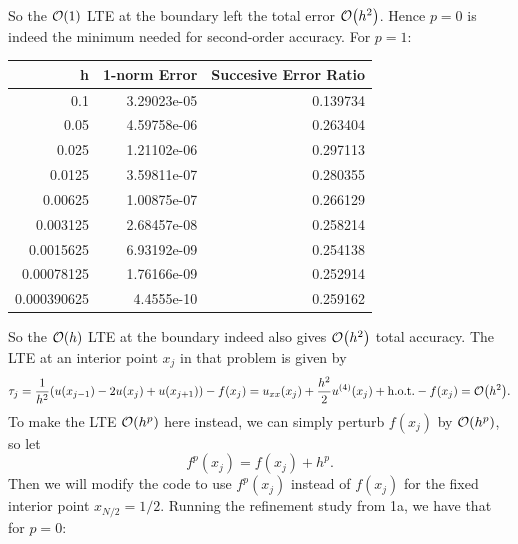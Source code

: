 \documentclass[12pt]{article}
\begin{document}
So the $\order{1}$ LTE at the boundary left the total error $\order{h^2}$.  Hence $p=0$ is indeed the minimum needed for second-order accuracy.  For $p=1$: \\
\begin{center}
\begin{tabular}{rrr}
\hline
    h &   1-norm Error &   Succesive Error Ratio \\
\hline
 0.1         &                   3.29023e-05 &                0.139734 \\
 0.05        &                   4.59758e-06 &                0.263404 \\
 0.025       &                   1.21102e-06 &                0.297113 \\
 0.0125      &                   3.59811e-07 &                0.280355 \\
 0.00625     &                   1.00875e-07 &                0.266129 \\
 0.003125    &                   2.68457e-08 &                0.258214 \\
 0.0015625   &                   6.93192e-09 &                0.254138 \\
 0.00078125  &                   1.76166e-09 &                0.252914 \\
 0.000390625 &                   4.4555e-10  &                0.259162 \\
\hline
\end{tabular}
\end{center}
So the $\order{h}$ LTE at the boundary indeed also gives $\order{h^2}$ total accuracy.
The LTE at an interior point $x_j$ in that problem is given by
$$\tau_j = \dfrac{1}{h^2}(u(x_{j-1}) -2u(x_j) + u(x_{j+1})) -f(x_j) = u_{xx}(x_j) + \dfrac{h^2}{2}u^{(4)}(x_j) + \text{h.o.t.} - f(x_j) = \order{h^2}.$$
To make the LTE $\order{h^p}$ here instead, we can simply perturb $f(x_j)$ by $\order{h^p}$, so let $$f^p(x_j) = f(x_j) + h^p.$$
Then we will modify the code to use $f^p(x_j)$ instead of $f(x_j)$ for the fixed interior point $x_{N/2} = 1/2$.
Running the refinement study from 1a, we have that for $p=0$:
\end{document}
